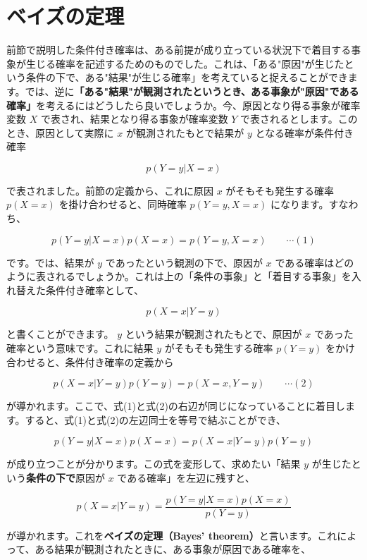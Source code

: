 \section{ベイズの定理}


前節で説明した条件付き確率は、ある前提が成り立っている状況下で着目する事象が生じる確率を記述するためのものでした。これは、「ある"原因"が生じたという条件の下で、ある"結果"が生じる確率」を考えていると捉えることができます。では、逆に\textbf{「ある"結果"が観測されたというとき、ある事象が"原因"である確率」}を考えるにはどうしたら良いでしょうか。今、原因となり得る事象が確率変数 $X$ で表され、結果となり得る事象が確率変数 $Y$ で表されるとします。このとき、原因として実際に $x$ が観測されたもとで結果が $y$ となる確率が条件付き確率


\[
p(Y = y | X = x)
\]


で表されました。前節の定義から、これに原因 $x$ がそもそも発生する確率 $p(X = x)$ を掛け合わせると、同時確率 $p(Y = y, X = x)$ になります。すなわち、


\[
p(Y = y | X = x) p(X = x) = p(Y = y, X = x) \hspace{2em} \cdots (1)
\]


です。では、結果が $y$ であったという観測の下で、原因が $x$ である確率はどのように表されるでしょうか。これは上の「条件の事象」と「着目する事象」を入れ替えた条件付き確率として、


\[
p(X = x | Y = y)
\]


と書くことができます。 $y$ という結果が観測されたもとで、原因が $x$ であった確率という意味です。これに結果 $y$ がそもそも発生する確率 $p(Y = y)$ をかけ合わせると、条件付き確率の定義から


\[
p(X = x| Y = y) p(Y = y) = p(X = x, Y = y) \hspace{2em} \cdots (2)
\]


が導かれます。ここで、式(1)と式(2)の右辺が同じになっていることに着目します。すると、式(1)と式(2)の左辺同士を等号で結ぶことができ、


\[
p(Y = y | X = x) p(X = x) = p(X = x | Y = y) p(Y = y)
\]


が成り立つことが分かります。この式を変形して、求めたい「結果 $y$ が生じたという\textbf{条件の下で}原因が $x$ である確率」を左辺に残すと、


\[
p(X = x | Y = y) = \frac{p(Y = y | X = x) p(X = x)}{p(Y = y)}
\]


が導かれます。これを\textbf{ベイズの定理（Bayes' theorem）}と言います。これによって、ある結果が観測されたときに、ある事象が原因である確率を、


